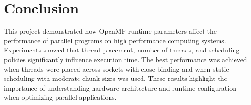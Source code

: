 \documentclass[conference]{IEEEtran}
\begin{document}
\section{Conclusion}

This project demonstrated how OpenMP runtime parameters affect the performance of parallel programs on high performance computing systems. Experiments showed that thread placement, number of threads, and scheduling policies significantly influence execution time. The best performance was achieved when threads were placed across sockets with close binding and when static scheduling with moderate chunk sizes was used. These results highlight the importance of understanding hardware architecture and runtime configuration when optimizing parallel applications.
\end{document}
